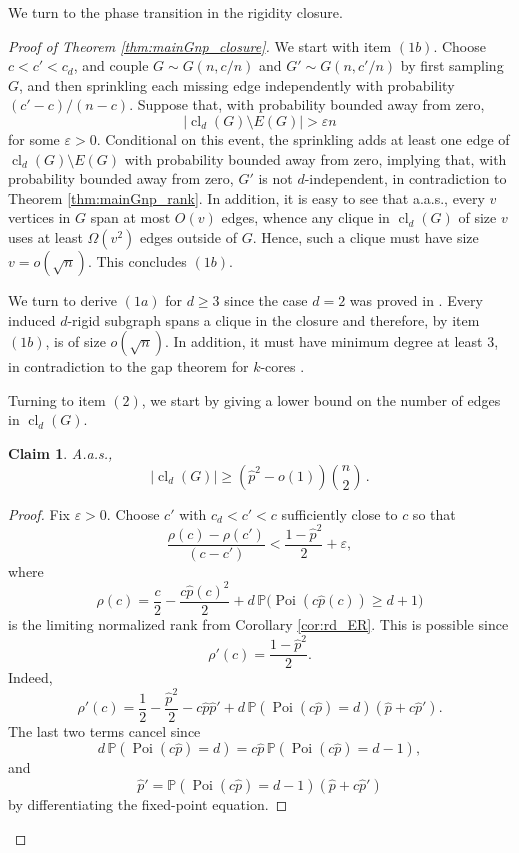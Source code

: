 \documentclass[reqno,english]{amsart}
\numberwithin{equation}{section}
\newtheorem{claim}[theorem]{Claim}
\theoremstyle{definition}{
\newtheorem{example}[theorem]{Example}
\newtheorem{definition}[theorem]{Definition}
\newtheorem*{definition*}{Definition}
\newtheorem{problem}[theorem]{Problem}
\newtheorem{question}[theorem]{Question}
}
\renewcommand{\P}{\mathbb P}
\begin{document}
We turn to the phase transition in the rigidity closure.

\begin{proof}[Proof of Theorem \ref{thm:mainGnp_closure}]
We start with item $(1b)$. 
Choose \(c<c'<c_d\), and couple \(G\sim G(n,c/n)\) and \(G'\sim G(n,c'/n)\) by first
sampling \(G\), and then sprinkling each missing edge independently with
probability \((c'-c)/(n-c)\). Suppose that, with probability bounded away
from zero,
\[
    |\operatorname{cl}_d(G)\setminus E(G)|>\varepsilon n
\]
for some \(\varepsilon>0\). Conditional on this event, the sprinkling adds
at least one edge of \(\operatorname{cl}_d(G)\setminus E(G)\) with
probability bounded away from zero, implying that, with probability bounded away from
zero, \(G'\) is not $d$-independent, in contradiction to Theorem \ref{thm:mainGnp_rank}. In addition, it is easy to see that a.a.s., every $v$ vertices in $G$ span at most $O(v)$ edges, 
whence any clique in $\operatorname{cl}_d(G)$ of size $v$ uses at least $\Omega(v^2)$ edges outside of $G$. Hence, such a clique must have size $v=o(\sqrt n)$. This concludes $(1b)$.

We turn to derive $(1a)$ for $d\ge 3$ since the case $d=2$ was proved in \cite{KasiviswanathanMooreTheranRigidityTransition}. 
Every induced $d$-rigid subgraph spans a clique in the closure and therefore,
by item $(1b)$, is of size $o(\sqrt n)$. In addition, it must have minimum degree at least $3$, in contradiction to the gap theorem for \(k\)-cores \cite{LuczakCoreSize}.

\smallskip

Turning to item $(2)$, we start by giving a lower bound on the number of edges in $\operatorname{cl}_d(G)$.
\begin{claim}\label{clm:closure_edges_lower}
    A.a.s.,
\[
    \left|\operatorname{cl}_d(G)\right|
    \ge
    \left(\hat p^2-o(1)\right)\binom{n}2\,.
\]
\end{claim}

\begin{proof}
Fix \(\varepsilon>0\). Choose \(c'\) with \(c_d<c'<c\) sufficiently close
to \(c\) so that
\begin{equation}\label{eq:cprime}
    \frac{\rho(c)-\rho(c')}{(c-c')}
    <
    \frac{1-\hat p^2}{2}+\varepsilon,    
\end{equation}
where
\[
    \rho(c)
    =
    \frac{c}{2}
    -
    \frac{c\hat p(c)^2}{2}
    +
    d\,\P\big(\operatorname{Poi}(c\hat p(c))\ge d+1\big)
\]
is the limiting normalized rank from Corollary \ref{cor:rd_ER}. This is
possible since
\[
    \rho'(c)=\frac{1-\hat p^2}{2}.
\]
Indeed,
\[
\rho'(c)
=
\frac12-\frac{\hat p^2}{2}
-c\hat p\hat p'
+
d\,\P(\operatorname{Poi}(c\hat p)=d)(\hat p+c\hat p').
\]
The last two terms cancel since
\[
d\,\P(\operatorname{Poi}(c\hat p)=d)
=
c\hat p\,\P(\operatorname{Poi}(c\hat p)=d-1),
\]
and 
\[
\hat p'
=
\P(\operatorname{Poi}(c\hat p)=d-1)(\hat p+c\hat p')
\]
by differentiating the fixed-point equation.


\end{proof}
\end{proof}
\end{document}
